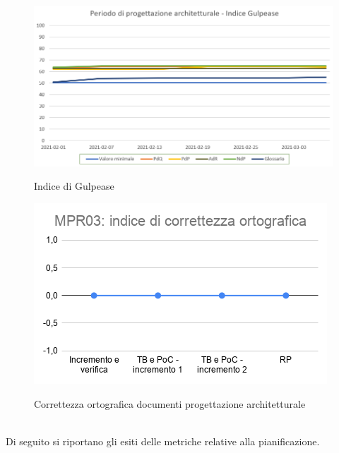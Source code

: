 \begin{figure}[h]
	\centering
	\includegraphics[scale=0.5]{Immagini/GulpeaseProgettazioneArchitetturale}\\
	\caption{Indice di Gulpease}
	\label{fig:GulpeasePArchitetturale}
\end{figure}
\begin{figure}[h]
	\centering
	\includegraphics[scale=0.6]{Immagini/MPR03_cortografica}\\
	\caption{Correttezza ortografica documenti progettazione architetturale}
	\label{fig:CortOrtograficaPArchitetturale}
\end{figure}
\\
Di seguito si riportano gli esiti delle metriche relative alla pianificazione.
